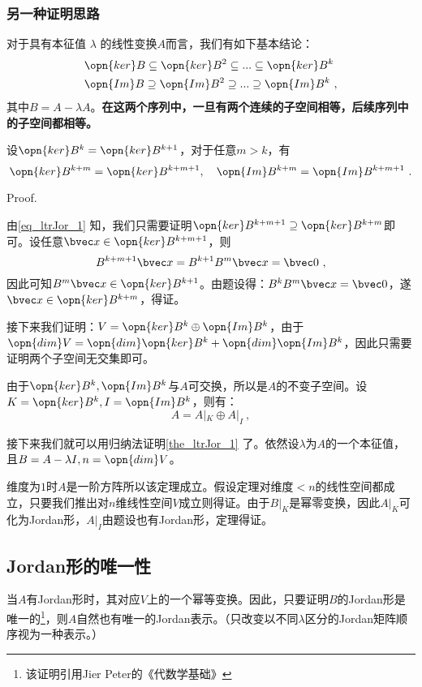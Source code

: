 \subsubsection{另一种证明思路}
对于具有本征值 $\lambda$ 的线性变换$A$而言，我们有如下基本结论：
\begin{equation}\label{eq_ltrJor_1}
\begin{aligned}
&\opn{ker}B\subseteq\opn{ker}B^2\subseteq...\subseteq\opn{ker}B^k\\
&\opn{Im}B\supseteq\opn{Im}B^2\supseteq...\supseteq\opn{Im}B^k~,
\end{aligned}
\end{equation}
其中$B=A-\lambda A$。\textbf{在这两个序列中，一旦有两个连续的子空间相等，后续序列中的子空间都相等。}
\begin{lemma}{}
设$\opn{ker}B^k=\opn{ker}B^{k+1}$，对于任意$m>k$，有\begin{equation}
\opn{ker}B^{k+m}=\opn{ker}B^{k+m+1},\quad\opn{Im}B^{k+m}=\opn{Im}B^{k+m+1}~.
\end{equation}
\end{lemma}
Proof.

由\autoref{eq_ltrJor_1} 知，我们只需要证明$\opn{ker}B^{k+m+1}\supseteq \opn{ker}B^{k+m}$即可。设任意$\bvec x\in \opn{ker}B^{k+m+1}$，则
\begin{equation}
B^{k+m+1}\bvec x=B^{k+1}B^m\bvec x=\bvec 0~,
\end{equation}
因此可知$B^m\bvec x\in\opn{ker}B^{k+1}$。由题设得：$B^{k}B^m\bvec x=\bvec 0$，遂$\bvec x\in\opn{ker}B^{k+m}$，得证。

接下来我们证明：$V=\opn{ker}B^k\oplus\opn{Im}B^k$，由于$\opn{dim}V=\opn{dim}\opn{ker}B^k+\opn{dim}\opn{Im}B^k$，因此只需要证明两个子空间无交集即可。

由于$\opn{ker}B^k,\opn{Im}B^k$与$A$可交换，所以是$A$的不变子空间。设$K=\opn{ker}B^k,I=\opn{Im}B^k$，则有：
\begin{equation}
A=A|_K\oplus A|_I~,
\end{equation}

接下来我们就可以用归纳法证明\autoref{the_ltrJor_1} 了。依然设$\lambda$为$A$的一个本征值，且$B=A-\lambda I,n=\opn{dim}V$。

维度为$1$时$A$是一阶方阵所以该定理成立。假设定理对维度$<n$的线性空间都成立，只要我们推出对$n$维线性空间$V$成立则得证。由于$B|_K$是幂零变换，因此$A|_K$可化为Jordan形，$A|_I$由题设也有Jordan形，定理得证。
\subsection{Jordan形的唯一性}
当$A$有Jordan形时，其对应$V$上的一个幂等变换。因此，只要证明$B$的Jordan形是唯一的\footnote{该证明引用Jier Peter的《代数学基础》}，则$A$自然也有唯一的Jordan表示。（只改变以不同$\lambda$区分的Jordan矩阵顺序视为一种表示。）

